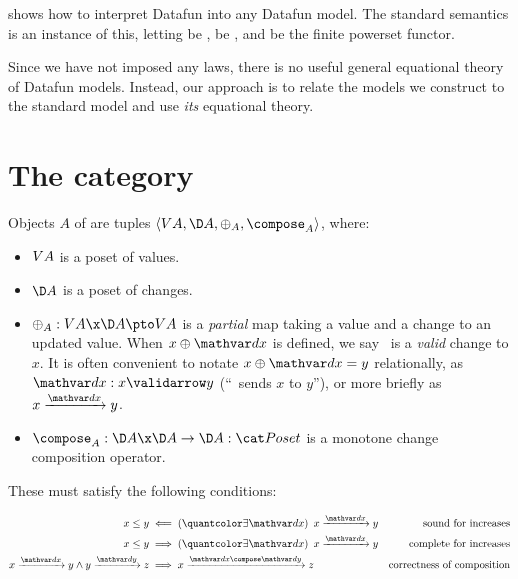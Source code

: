 \noindent
{} shows how to interpret Datafun into any Datafun
model. The standard semantics is an instance of this, letting \catC{} be
\Poset{}, \iso{} be \iso{}, and \pfin{} be the finite powerset functor.

Since we have not imposed any laws, there is no useful general equational theory
of Datafun models. Instead, our approach is to relate the models we construct to
the standard model and use \emph{its} equational theory.





\section{The category \CP}
\label{sec:changeposets}

Objects $A$ of \CP{} are tuples $\tuple{\vals A, \chgs A, \updfn_A,
  \composefn_A}$, where:

\begin{itemize}
\item $V A$ is a poset of values.

\item $\chgs A$ is a poset of changes.

\item $\updfn_A : \vals A \x \chgs A \pto \vals A$ is a \emph{partial} map
  taking a value and a change to an updated value. When $x \upd \dx$ is defined,
  we say \dx\ is a \emph{valid} change to $x$. It is often convenient to notate
  $x \upd \dx = y$ relationally, as $\valid\dx x y$ (``\dx\ sends $x$ to $y$''),
  or more briefly as $\vld\dx x y$.

\item $\composefn_A : \chgs A \x \chgs A \to \chgs A : \Poset$ is a monotone
  change composition operator.
\end{itemize}

\noindent
These must satisfy the following conditions:

\nopagebreak[2]
\begin{align*}
  x \le y &\impliedby \ex{\dx} \vld{\dx} x y
  & \text{sound for increases}\\
  x \le y &\implies \ex{\dx} \vld{\dx} x y
  & \text{complete for increases}\\
  \vld\dx x y \wedge \vld\dy y z &\implies \vld{\dx\compose\dy} x z
  & \text{correctness of composition}
\end{align*}


